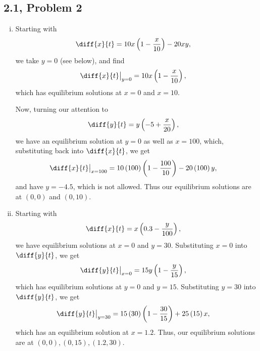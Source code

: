 \documentclass[10pt]{mypackage}
\begin{document}
\subsection{2.1, Problem 2}%
\begin{enumerate}[(i)]
  \item Starting with
    \begin{align*}
      \diff{x}{t} &= 10x\left(1-\frac{x}{10}\right)-20xy,
    \end{align*}
    we take $y=0$ (see below), and find
    \begin{align*}
      \diff{x}{t}\bigr\vert_{y=0} &= 10x\left(1-\frac{x}{10}\right),
    \end{align*}
    which has equilibrium solutions at $x=0$ and $x=10$.\newline

    Now, turning our attention to
    \begin{align*}
      \diff{y}{t} &= y\left(-5 + \frac{x}{20}\right),
    \end{align*}
    we have an equilibrium solution at $y=0$ as well as $x=100$, which, substituting back into $\diff{x}{t}$, we get
    \begin{align*}
      \diff{x}{t}\bigr\vert_{x=100} &= 10\left(100\right) \left(1-\frac{100}{10}\right) - 20\left(100\right)y,
    \end{align*}
    and have $y=-4.5$, which is not allowed. Thus our equilibrium solutions are at $\left(0,0\right)$ and $\left(0,10\right)$.
  \item Starting with
    \begin{align*}
      \diff{x}{t} &= x\left(0.3 - \frac{y}{100}\right),
    \end{align*}
    we have equilibrium solutions at $x=0$ and $y=30$. Substituting $x=0$ into $\diff{y}{t}$, we get
    \begin{align*}
      \diff{y}{t} \bigr\vert_{x=0} &= 15y\left(1-\frac{y}{15}\right),
    \end{align*}
    which has equilibrium solutions at $y=0$ and $y=15$. Substituting $y=30$ into $\diff{y}{t}$, we get
    \begin{align*}
      \diff{y}{t}\bigr\vert_{y=30} &= 15\left(30\right) \left(1-\frac{30}{15}\right) + 25\left(15\right)x,
    \end{align*}
    which has an equilibrium solution at $x=1.2$. Thus, our equilibrium solutions are at $\left(0,0\right), \left(0,15\right),\left(1.2,30\right)$.
\end{enumerate}
\end{document}

